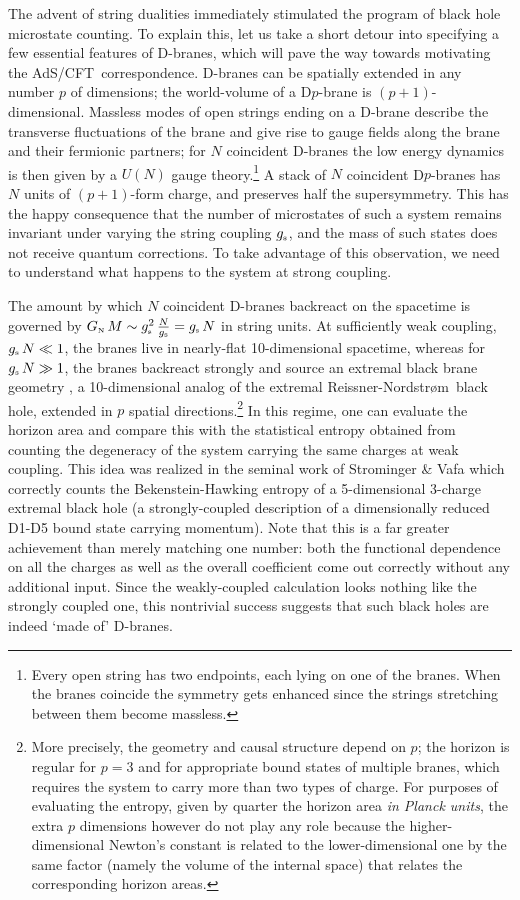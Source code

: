 \documentclass[12pt]{article}
\def\AC{AdS/CFT}
\def\RN{Reissner-Nordstr\o m}
\def\gst{g_{\scriptscriptstyle {\rm s}}}
\def\GN{G_{\scriptscriptstyle {\rm N}}}
\begin{document}
The advent of string dualities immediately stimulated the program of black hole microstate counting.
   To explain this, let us take a short detour into specifying a few essential features of D-branes, which will pave the way towards motivating the \AC\ correspondence.
D-branes can be spatially
 extended in any number $p$ of dimensions;
   the world-volume of a  D$p$-brane is $(p+1)$-dimensional.  
  Massless modes of open strings ending on a D-brane describe the transverse fluctuations of the brane and give rise to gauge fields along the brane and their fermionic partners; for  $N$ coincident D-branes the low energy dynamics is then given by a $U(N)$ gauge theory.\footnote{
Every open string has two endpoints, each lying on one of the branes.
When the branes coincide the symmetry gets enhanced since the strings stretching between them become massless.
}  A stack of $N$ coincident D$p$-branes has $N$ units of $(p+1)$-form charge, and preserves half the supersymmetry.
 This has the happy consequence that the number of microstates of such a system  remains invariant under varying the string coupling $\gst$, and  the mass of such states does not receive quantum corrections.
To take advantage of this observation, we need to understand what happens to the system at strong coupling.  


The amount by which  $N$ coincident D-branes backreact on the spacetime is governed by 
$\GN \, M \sim \gst^2 \, \frac{N}{\gst} =  \gst \, N$ in string units.  At sufficiently weak coupling, $\gst \, N \ll 1$, the branes live in nearly-flat 10-dimensional spacetime, whereas for $\gst \, N \gg 1$, the branes backreact strongly and source an extremal black brane geometry \cite{Horowitz:1991cd}, a 10-dimensional analog of the extremal \RN\ black hole, extended in $p$ spatial directions.\footnote{
More precisely, the geometry and causal structure depend on $p$; the horizon is regular for $p=3$ and for appropriate bound states of multiple branes, which requires the system to carry more than two types of charge.
For purposes of evaluating the entropy, given by quarter the horizon area {\it in Planck units}, the extra $p$ dimensions however do not play any role because the higher-dimensional Newton's constant is related to the lower-dimensional one by the same factor (namely the volume of the internal space) that relates the corresponding horizon areas. 
}
 In this regime, one can evaluate the horizon area
 and compare this with the statistical entropy obtained from counting the degeneracy of the system carrying the same charges at weak coupling.
This idea was realized in the seminal work of Strominger \& Vafa \cite{Strominger:1996sh}
which correctly counts the Bekenstein-Hawking entropy of a  5-dimensional 3-charge extremal black hole (a strongly-coupled description of a dimensionally reduced D1-D5 bound state carrying momentum).  Note that this is  a far greater achievement than merely matching one number: both the functional dependence on all the charges as well as the overall coefficient come out correctly without any additional input.  Since the weakly-coupled calculation looks nothing like the strongly coupled one, this nontrivial success suggests that such black holes are indeed `made of' D-branes.
\end{document}
